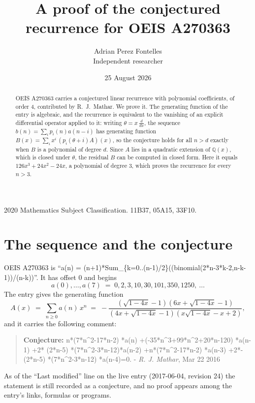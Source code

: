 \documentclass[11pt,a4paper]{article}
\title{A proof of the conjectured recurrence for OEIS A270363}
\author{Adrian Perez Fontelles\\ \small Independent researcher}
\date{25 August 2026}
\theoremstyle{plain}
\theoremstyle{definition}
\begin{document}
\maketitle

\begin{abstract}
OEIS A270363 carries a conjectured linear recurrence with polynomial coefficients, of
order 4, contributed by R.~J.~Mathar. We prove it. The generating function of the
entry is algebraic, and the recurrence is equivalent to the vanishing of an explicit
differential operator applied to it: writing $\theta=x\,\frac{d}{dx}$, the sequence
$b(n)=\sum_{i}p_{i}(n)a(n-i)$ has generating function
$B(x)=\sum_{i}x^{i}\,(p_{i}(\theta+i)A)(x)$, so the conjecture holds for all $n>d$ exactly
when $B$ is a polynomial of degree $d$. Since $A$ lies in a quadratic extension of
$\mathbb{Q}(x)$, which is closed under $\theta$, the residual $B$ can be computed in
closed form. Here it equals $126 x^{3} + 24 x^{2} - 24 x$, a polynomial of degree $3$, which proves
the recurrence for every $n>3$.
\end{abstract}

\noindent\small 2020 Mathematics Subject Classification. 11B37, 05A15, 33F10.\normalsize

\section{The sequence and the conjecture}

OEIS A270363 is ``a(n) = (n+1)*Sum\_\{k=0..(n-1)/2\}((binomial(2*n-3*k-2,n-k-1))/(n-k))''. It has offset $0$ and begins
\[
a(0),\dots,a(7)\;=\;0, 2, 3, 10, 30, 101, 350, 1250,\ \dots
\]
The entry gives the generating function
\begin{equation}\label{eq:gf}
A(x)\;=\;\sum_{n\ge 0} a(n)\,x^{n}\;=\;- \frac{\left(\sqrt{1 - 4 x} - 1\right) \left(6 x + \sqrt{1 - 4 x} - 1\right)}{\left(4 x + \sqrt{1 - 4 x} - 1\right) \left(x \sqrt{1 - 4 x} - x + 2\right)} ,
\end{equation}
and it carries the following comment:
\begin{quote}\small
\textbf{Conjecture:} n*(7*n\^{}2-17*n-2) *a(n) +(-35*n\^{}3+99*n\^{}2+20*n-120) *a(n-1) +2* (2*n-5) *(7*n\^{}2-3*n-12)*a(n-2) +n*(7*n\^{}2-17*n-2) *a(n-3) +2*-(2*n-5) *(7*n\^{}2-3*n-12) *a(n-4)=0. - \emph{R. J. Mathar}, Mar 22 2016
\end{quote}
As of the ``Last modified'' line on the live entry (2017-06-04, revision 24) the
statement is still recorded as a conjecture, and no proof appears among the entry's links,
formulas or programs.
\end{document}
